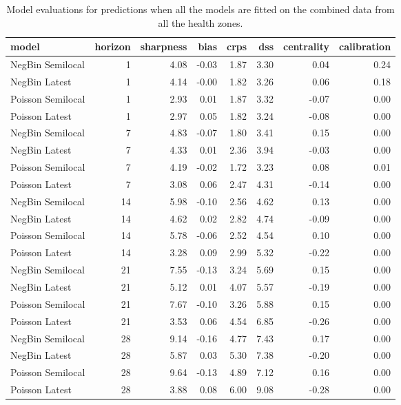 \begin{table}[ht]
\centering
\begin{tabular}{lrrrrrrr}
  \hline
model & horizon & sharpness & bias & crps & dss & centrality & calibration \\ 
  \hline
NegBin Semilocal &   1 & 4.08 & -0.03 & 1.87 & 3.30 & 0.04 & 0.24 \\ 
  NegBin Latest &   1 & 4.14 & -0.00 & 1.82 & 3.26 & 0.06 & 0.18 \\ 
  Poisson Semilocal &   1 & 2.93 & 0.01 & 1.87 & 3.32 & -0.07 & 0.00 \\ 
  Poisson Latest &   1 & 2.97 & 0.05 & 1.82 & 3.24 & -0.08 & 0.00 \\ 
  NegBin Semilocal &   7 & 4.83 & -0.07 & 1.80 & 3.41 & 0.15 & 0.00 \\ 
  NegBin Latest &   7 & 4.33 & 0.01 & 2.36 & 3.94 & -0.03 & 0.00 \\ 
  Poisson Semilocal &   7 & 4.19 & -0.02 & 1.72 & 3.23 & 0.08 & 0.01 \\ 
  Poisson Latest &   7 & 3.08 & 0.06 & 2.47 & 4.31 & -0.14 & 0.00 \\ 
  NegBin Semilocal &  14 & 5.98 & -0.10 & 2.56 & 4.62 & 0.13 & 0.00 \\ 
  NegBin Latest &  14 & 4.62 & 0.02 & 2.82 & 4.74 & -0.09 & 0.00 \\ 
  Poisson Semilocal &  14 & 5.78 & -0.06 & 2.52 & 4.54 & 0.10 & 0.00 \\ 
  Poisson Latest &  14 & 3.28 & 0.09 & 2.99 & 5.32 & -0.22 & 0.00 \\ 
  NegBin Semilocal &  21 & 7.55 & -0.13 & 3.24 & 5.69 & 0.15 & 0.00 \\ 
  NegBin Latest &  21 & 5.12 & 0.01 & 4.07 & 5.57 & -0.19 & 0.00 \\ 
  Poisson Semilocal &  21 & 7.67 & -0.10 & 3.26 & 5.88 & 0.15 & 0.00 \\ 
  Poisson Latest &  21 & 3.53 & 0.06 & 4.54 & 6.85 & -0.26 & 0.00 \\ 
  NegBin Semilocal &  28 & 9.14 & -0.16 & 4.77 & 7.43 & 0.17 & 0.00 \\ 
  NegBin Latest &  28 & 5.87 & 0.03 & 5.30 & 7.38 & -0.20 & 0.00 \\ 
  Poisson Semilocal &  28 & 9.64 & -0.13 & 4.89 & 7.12 & 0.16 & 0.00 \\ 
  Poisson Latest &  28 & 3.88 & 0.08 & 6.00 & 9.08 & -0.28 & 0.00 \\ 
   \hline
\end{tabular}
\caption{Model evaluations for predictions when all the models are fitted on the combined data from all the health zones.} 
\label{tab:nat_evo}
\end{table}
